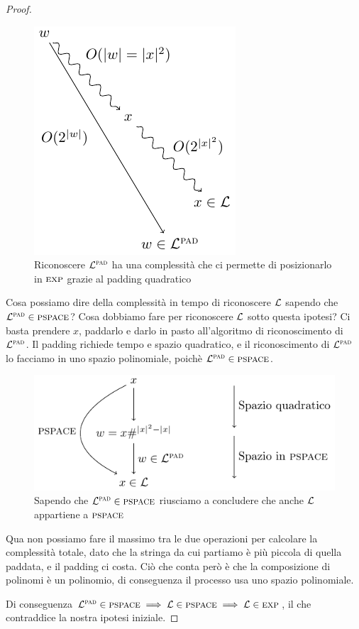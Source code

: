 \begin{proof}
    \begin{figure}[h]
        \begin{center}
            \includegraphics{./img/timespacehierarchies/PaddingCheat.pdf}
            \caption{Riconoscere $\mathcal{L}^{\textsc{pad}}$ ha una complessità che ci permette di posizionarlo in
            $\textsc{exp}$ grazie al padding quadratico}
        \end{center}
    \end{figure}

    Cosa possiamo dire della complessità in tempo di riconoscere $\mathcal{L}$ sapendo che $\mathcal{L}^{\textsc{pad}} \in
    \textsc{pspace}$? Cosa dobbiamo fare per riconoscere $\mathcal{L}$ sotto questa ipotesi? Ci basta prendere
    $x$, paddarlo e darlo in pasto all'algoritmo di riconoscimento di $\mathcal{L}^{\textsc{pad}}$. Il padding richiede
    tempo e spazio quadratico, e il riconoscimento di $\mathcal{L}^{\textsc{pad}}$ lo facciamo in uno spazio polinomiale,
    poichè $\mathcal{L}^{\textsc{pad}} \in \textsc{pspace}$.

    \begin{figure}[h]
        \begin{center}
            \includegraphics{./img/timespacehierarchies/LPadComplexity.pdf}
            \caption{Sapendo che $\mathcal{L}^{\textsc{pad}} \in \textsc{pspace}$ riusciamo a concludere che anche $\mathcal{L}$
            appartiene a $\textsc{pspace}$}
        \end{center}
    \end{figure}

    Qua non possiamo fare il massimo tra le due operazioni per calcolare la complessità totale,
    dato che la stringa da cui partiamo è più piccola di quella paddata, e il padding ci costa.
    Ciò che conta però è che la composizione di polinomi è un polinomio, di conseguenza il
    processo usa uno spazio polinomiale.

    Di conseguenza $\mathcal{L}^{\textsc{pad}} \in \textsc{pspace} \implies \mathcal{L} \in \textsc{pspace} \implies \mathcal{L} \in \textsc{exp}$, il che
    contraddice la nostra ipotesi iniziale.
\end{proof}

